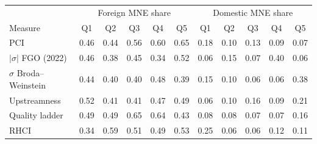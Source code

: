 \begin{tabular}{lccccc|ccccc}
\toprule
 & \multicolumn{5}{c}{Foreign MNE share} & \multicolumn{5}{c}{Domestic MNE share} \\
Measure & Q1 & Q2 & Q3 & Q4 & Q5 & Q1 & Q2 & Q3 & Q4 & Q5 \\
\midrule
PCI & 0.46 & 0.44 & 0.56 & 0.60 & 0.65 & 0.18 & 0.10 & 0.13 & 0.09 & 0.07 \\
$|\sigma|$ FGO (2022) & 0.46 & 0.38 & 0.45 & 0.34 & 0.52 & 0.06 & 0.15 & 0.07 & 0.40 & 0.06 \\
$\sigma$ Broda--Weinstein & 0.44 & 0.40 & 0.40 & 0.48 & 0.39 & 0.15 & 0.10 & 0.06 & 0.06 & 0.38 \\
Upstreamness & 0.52 & 0.41 & 0.41 & 0.47 & 0.49 & 0.06 & 0.10 & 0.16 & 0.09 & 0.21 \\
Quality ladder & 0.49 & 0.49 & 0.65 & 0.64 & 0.43 & 0.08 & 0.08 & 0.07 & 0.07 & 0.16 \\
RHCI & 0.34 & 0.59 & 0.51 & 0.49 & 0.53 & 0.25 & 0.06 & 0.06 & 0.12 & 0.11 \\
\bottomrule
\end{tabular}
